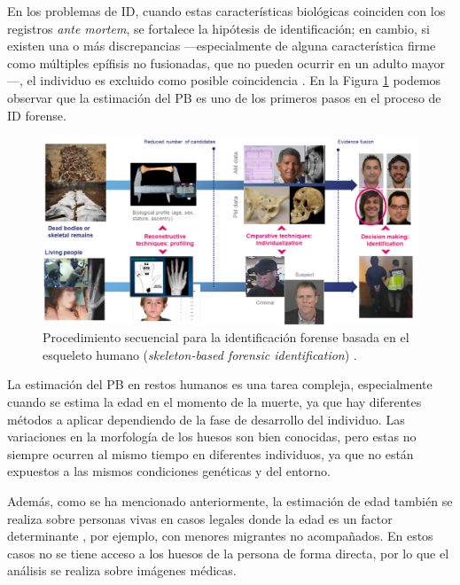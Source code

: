En los problemas de \acrshort{ID}, cuando estas características biológicas coinciden con los registros \textit{ante mortem}, se fortalece la hipótesis de identificación; en cambio, si existen una o más discrepancias ---especialmente de alguna característica firme como múltiples epífisis no fusionadas, que no pueden ocurrir en un adulto mayor---, el individuo es excluido como posible coincidencia \cite{byers2023}. En la Figura \ref{fig:SFI_pipeline} podemos observar que la estimación del \acrshort{PB} es uno de los primeros pasos en el proceso de \acrshort{ID} forense. 

\begin{figure}[htbp]
    \centering
    \includegraphics[width=\textwidth]{capitulos/cap_01/imagenes/SFI_pipeline.png}
    \caption{Procedimiento secuencial para la identificación forense basada en el esqueleto humano (\textit{skeleton-based forensic identification}) \cite{mesejo2020}.} 
    \label{fig:SFI_pipeline}
\end{figure}

La estimación del \acrshort{PB} en restos humanos es una tarea compleja, especialmente cuando se estima la edad en el momento de la muerte, ya que hay diferentes métodos a aplicar dependiendo de la fase de desarrollo del individuo. Las variaciones en la morfología de los huesos son bien conocidas, pero estas no siempre ocurren al mismo tiempo en diferentes individuos, ya que no están expuestos a las mismos condiciones genéticas y del entorno.

Además, como se ha mencionado anteriormente, la estimación de edad también se realiza sobre personas vivas en casos legales donde la edad es un factor determinante \cite{schmeling2016}, por ejemplo, con menores migrantes no acompañados. En estos casos no se tiene acceso a los huesos de la persona de forma directa, por lo que el análisis se realiza sobre imágenes médicas.

